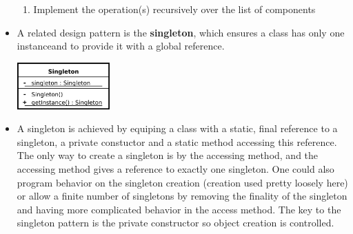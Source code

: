 \documentclass[letterpaper] {article}
\begin{document}
\begin{itemize}
\begin{enumerate}
                \item Implement the operation(s) recursively over the list of components
            \end{enumerate}
        \item A related design pattern is the \textbf{singleton}, which ensures a class has only one instanceand to provide it with a global reference. 
            \begin{center}
                \includegraphics[width=1.4in]{singleton}
            \end{center}
        \item A singleton is achieved by equiping a class with a static, final reference to a singleton, a private constuctor and a static method accessing this reference. The only way to create a singleton is by the accessing method, and the accessing method gives a reference to exactly one singleton. One could also program behavior on the singleton creation (creation used pretty loosely here) or allow a finite number of singletons by removing the finality of the singleton and having more complicated behavior in the access method. The key to the singleton pattern is the private constructor so object creation is controlled. 
    \end{itemize}
\end{document}
